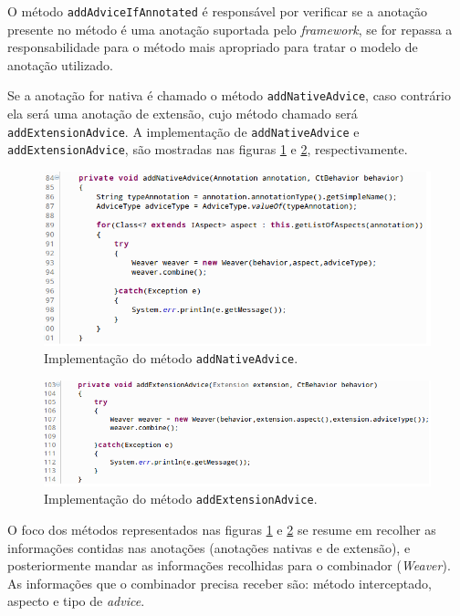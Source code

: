 \documentclass[tc,oneside]{iiufrgs}
\begin{document}
O método \texttt{addAdviceIfAnnotated} é responsável por verificar se a anotação presente no método é uma anotação suportada pelo \textit{framework}, se for repassa a responsabilidade para o método mais apropriado para tratar o modelo de anotação utilizado.

Se a anotação for nativa é chamado o método \texttt{addNativeAdvice}, caso contrário ela será uma anotação de extensão, cujo método chamado será \texttt{addExtensionAdvice}. A implementação de \texttt{addNativeAdvice} e \texttt{addExtensionAdvice}, são mostradas nas figuras \ref{fig:addnativeadvice} e \ref{fig:addextensionadvice}, respectivamente.

\begin{figure}[ht]
	\centering
	\includegraphics[scale=0.5]{figuras/implementacao/addnativeadvice.png}
	\caption{Implementação do método \texttt{addNativeAdvice}.}
	\label{fig:addnativeadvice}
\end{figure}

\begin{figure}[ht]
	\centering
	\includegraphics[scale=0.5]{figuras/implementacao/addextensionadvice.png}
	\caption{Implementação do método \texttt{addExtensionAdvice}.}
	\label{fig:addextensionadvice}
\end{figure}

O foco dos métodos representados nas figuras \ref{fig:addnativeadvice} e \ref{fig:addextensionadvice} se resume em recolher as informações contidas nas anotações (anotações nativas e de extensão), e posteriormente mandar as informações recolhidas para o combinador (\textit{Weaver}). As informações que o combinador precisa receber são: método interceptado, aspecto e tipo de \textit{advice}. 
\end{document}
